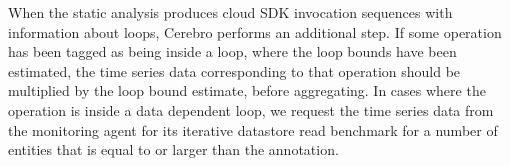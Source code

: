 When the static analysis produces cloud SDK invocation 
sequences with information about loops, Cerebro performs an additional step.
If some operation has been tagged as being inside a loop, where the loop
bounds have been estimated, the time series data corresponding to that 
operation should be multiplied 
by the loop bound estimate, before aggregating. In cases where the operation 
is inside a data dependent loop, we request the time series data from 
the monitoring agent for its iterative datastore read benchmark 
for a number of entities that is equal to or larger than the annotation. 

